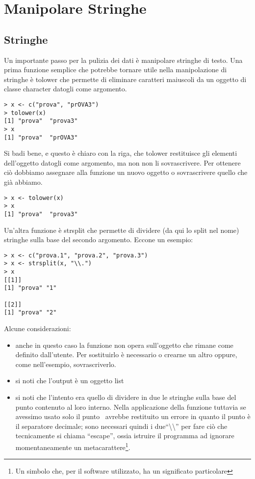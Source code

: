 \chapter{Manipolare Stringhe}
\section{Stringhe}
Un importante passo per la pulizia dei dati è manipolare stringhe di testo. 
Una prima funzione semplice che potrebbe tornare utile nella manipolazione di stringhe è \textsf{tolower} che permette di eliminare caratteri maiuscoli da un   oggetto di classe character datogli come argomento. 
\begin{lstlisting}
> x <- c("prova", "prOVA3")
> tolower(x)
[1] "prova"  "prova3"
> x
[1] "prova"  "prOVA3"
\end{lstlisting}
Si badi bene, e questo è chiaro con la riga, che \textsf{tolower} restituisce gli elementi dell'oggetto datogli come argomento, ma non non li sovrascrivere. Per ottenere ciò dobbiamo assegnare alla funzione un nuovo oggetto o sovrascrivere quello che già abbiamo.
\begin{lstlisting}
> x <- tolower(x)
> x
[1] "prova"  "prova3"
\end{lstlisting}

Un'altra funzione è \textsf{strsplit} che permette di dividere (da qui lo split nel nome) stringhe sulla base del secondo argomento. Eccone un esempio:
\begin{lstlisting}
> x <- c("prova.1", "prova.2", "prova.3")
> x <- strsplit(x, "\\.")
> x
[[1]]
[1] "prova" "1"    

[[2]]
[1] "prova" "2"  
\end{lstlisting}
Alcune considerazioni:
\begin{itemize}
\item anche in questo caso la funzione non opera sull'oggetto che rimane come definito dall'utente. Per sostituirlo è necessario o crearne un altro oppure, come nell'esempio, sovrascriverlo.
\item si noti che l'output è un oggetto list
\item si noti che l'intento era quello di dividere in due le stringhe sulla base del punto contenuto al loro interno. Nella applicazione della funzione tuttavia se avessimo usato solo il punto \erre\ avrebbe restituito un errore in quanto il punto è il separatore decimale; sono necessari quindi i due``\textbackslash\textbackslash'' per fare ciò che tecnicamente si chiama ``escape'', ossia istruire il programma ad ignorare momentaneamente un metacarattere\footnote{Un simbolo che, per il software utilizzato, ha un significato particolare}.
\end{itemize}



